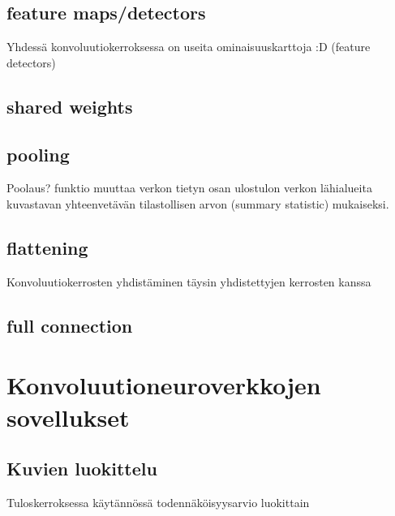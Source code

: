 \documentclass[finnish]{tktltiki2}
\theoremstyle{definition}
\theoremstyle{remark}
\begin{document}
  \subsection{feature maps/detectors}
  Yhdessä konvoluutiokerroksessa on useita ominaisuuskarttoja :D (feature detectors) 

  \subsection{shared weights}

  \subsection{pooling}
  Poolaus? funktio muuttaa verkon tietyn osan ulostulon verkon lähialueita kuvastavan yhteenvetävän tilastollisen arvon (summary statistic) mukaiseksi.
  \subsection{flattening}
  Konvoluutiokerrosten yhdistäminen täysin yhdistettyjen kerrosten kanssa

  \subsection{full connection}

  \section{Konvoluutioneuroverkkojen sovellukset}
  \subsection{Kuvien luokittelu}
  Tuloskerroksessa käytännössä todennäköisyysarvio luokittain












  \nocite{*}
  
  





  
\end{document}
